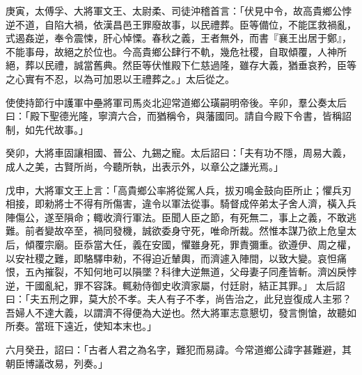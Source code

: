 \begin{pinyinscope}
 
庚寅，太傅孚、大將軍文王、太尉柔、司徒沖稽首言：「伏見中令，故高貴鄉公悖逆不道，自陷大禍，依漢昌邑王罪廢故事，以民禮葬。臣等備位，不能匡救禍亂，式遏姦逆，奉令震悚，肝心悼慄。春秋之義，王者無外，而書『襄王出居于鄭』，不能事母，故絕之於位也。今高貴鄉公肆行不軌，幾危社稷，自取傾覆，人神所絕，葬以民禮，誠當舊典。然臣等伏惟殿下仁慈過隆，雖存大義，猶垂哀矜，臣等之心實有不忍，以為可加恩以王禮葬之。」太后從之。
 
 
 
 
 使使持節行中護軍中壘將軍司馬炎北迎常道鄉公璜嗣明帝後。辛卯，羣公奏太后曰：「殿下聖德光隆，寧濟六合，而猶稱令，與藩國同。請自今殿下令書，皆稱詔制，如先代故事。」
 
 
 
 
 癸卯，大將車固讓相國、晉公、九錫之寵。太后詔曰：「夫有功不隱，周易大義，成人之美，古賢所尚，今聽所執，出表示外，以章公之謙光焉。」
 
 
戊申，大將軍文王上言：「高貴鄉公率將從駕人兵，拔刃鳴金鼓向臣所止；懼兵刃相接，即勑將士不得有所傷害，違令以軍法從事。騎督成倅弟太子舍人濟，橫入兵陣傷公，遂至隕命；輙收濟行軍法。臣聞人臣之節，有死無二，事上之義，不敢逃難。前者變故卒至，禍同發機，誠欲委身守死，唯命所裁。然惟本謀乃欲上危皇太后，傾覆宗廟。臣忝當大任，義在安國，懼雖身死，罪責彌重。欲遵伊、周之權，以安社稷之難，即駱驛申勑，不得迫近輦輿，而濟遽入陣間，以致大變。哀怛痛恨，五內摧裂，不知何地可以隕墜？科律大逆無道，父母妻子同產皆斬。濟凶戾悖逆，干國亂紀，罪不容誅。輒勑侍御史收濟家屬，付廷尉，結正其罪。」
 太后詔曰：「夫五刑之罪，莫大於不孝。夫人有子不孝，尚告治之，此兒豈復成人主邪？吾婦人不達大義，以謂濟不得便為大逆也。然大將軍志意懇切，發言惻愴，故聽如所奏。當班下遠近，使知本末也。」
 
 
 
 
 六月癸丑，詔曰：「古者人君之為名字，難犯而易諱。今常道鄉公諱字甚難避，其朝臣博議改易，列奏。」
 
 
\end{pinyinscope}